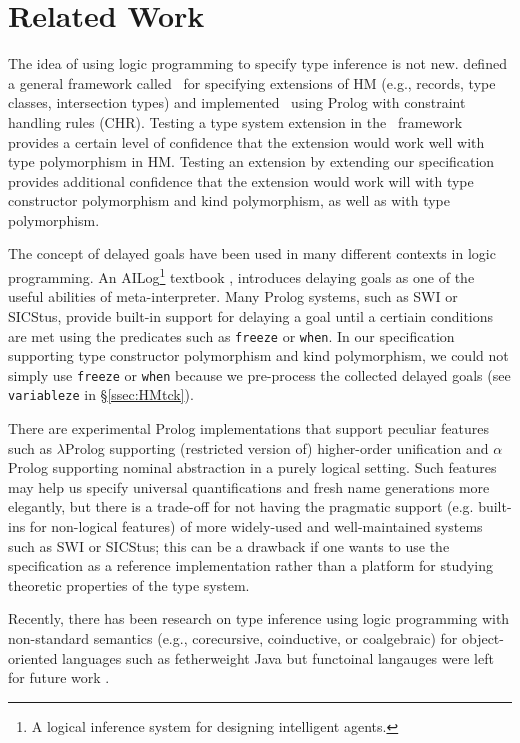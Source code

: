 \section{Related Work}\label{sec:relwork}
The idea of using logic programming to specify type inference is not new.
\citet*{HMX99} defined a general framework called \HMX\ for specifying
extensions of HM (e.g., records, type classes, intersection types)
and \citet{tyinferCHR02} implemented \HMX\ using Prolog with
constraint handling rules (CHR). Testing a type system extension
in the \HMX\ framework provides a certain level of confidence that the extension
would work well with type polymorphism in HM. Testing an extension by
extending our specification provides additional confidence that the extension
would work will with type constructor polymorphism and kind polymorphism,
as well as with type polymorphism.

The concept of delayed goals have been used in many different contexts
in logic programming. An AILog\footnote{A logical inference system for designing
	 intelligent agents.} textbook \cite{AILogTextBook},
introduces delaying goals as one of the useful abilities of meta-interpreter.
Many Prolog systems, such as SWI or SICStus, provide built-in support for
delaying a goal until a certiain conditions are met using the predicates
such as \verb|freeze| or \verb|when|. In our specification supporting
type constructor polymorphism and kind polymorphism, we could not
simply use \verb|freeze| or \verb|when| because we pre-process
the collected delayed goals (see \verb|variableze| in \S\ref{ssec:HMtck}).


There are experimental Prolog implementations that support peculiar features
such as
$\lambda$Prolog
supporting (restricted version of) higher-order unification
and 
$\alpha$Prolog
supporting nominal abstraction in a purely logical setting.
Such features may help us specify universal quantifications and fresh name
generations more elegantly, but there is a trade-off for not having the
pragmatic support (e.g. built-ins for non-logical features) of more widely-used
and well-maintained systems such as SWI or SICStus; this can be a drawback if
one wants to use the specification as a reference implementation rather than
a platform for studying theoretic properties of the type system.

Recently, there has been research on type inference using logic programming
with non-standard semantics (e.g., corecursive, coinductive, or coalgebraic)
for object-oriented languages such as fetherweight Java but functoinal langauges
were left for future work \cite{AnconaLZ08}.

